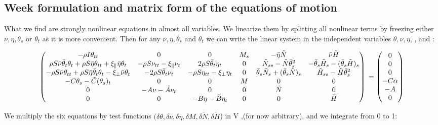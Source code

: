 
\subsection{Week formulation and matrix form of the equations of motion}
What we find are strongly nonlinear equations in almost all variables.
We linearize them by splitting all nonlinear terms by freezing either $\nu, \eta, \theta_s$ or $\theta_t$ as it is more convenient. Then for any $\bar{\nu}, \bar{\eta}, \bar{\theta}_s$ and $\bar{\theta}_t$ we can write the linear system in the independent variables $\theta, \nu, \eta$, ,  and :

\[\begin{pmatrix}
-\rho I \theta_{tt} & 0 & 0 & M_s & -\bar{\eta}\tilde{N} & \bar{\nu}\tilde{H} %
\\
\rho S\bar{\nu}\bar{\theta}_t\theta_t + \rho S \bar{\eta}\theta_{tt} + \xi_{\parallel}\bar{\eta}\theta_t & -\rho S \nu_{tt} -\xi_{\parallel}\nu_t & 2 \rho S\bar{\theta}_t\eta_t & 0 &    \tilde{N}_{ss} - \tilde{N}\bar{\theta}_s^2 & -\bar{\theta}_s \tilde{H}_s - (\bar{\theta}_s \tilde{H})_s 
\\
-\rho S \bar{\nu}\theta_{tt} + \rho S \bar{\eta}\bar{\theta}_t\theta_t - \xi_{\perp}\bar{\nu}\theta_t & - 2\rho S \bar{\theta}_t \nu_t & - \rho S \eta_{tt} - \xi_{\perp}\eta_t & 0 & \bar{\theta}_s \tilde{N}_s + (\bar{\theta}_s \tilde{N})_s & \tilde{H}_{ss}-\tilde{H}\bar{\theta}_s^2 
\\
-C\theta_s -\tilde{C}(\theta_s)_t & 0 & 0 & M & 0 & 0 
\\
0 & -A\nu -\tilde{A}\nu_t & 0 & 0 & \tilde{N} & 0 
\\
0 & 0 & - B\eta - \tilde{B}\eta_t & 0 & 0 & \tilde{H} 
\end{pmatrix}
\\ =
\begin{pmatrix}
0\\
0\\
0\\
-C\alpha\\
-A\\
0
\end{pmatrix}\]


We multiply the six equations by test functions
$(\delta \theta, \delta\nu, \delta \eta, \delta M,\delta \tilde{N}, \delta \tilde{H}$) in V ,(for now arbitrary), and we integrate from 0 to 1: 

